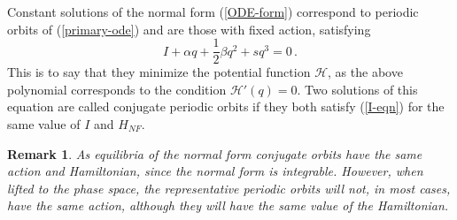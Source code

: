 \documentclass[10pt]{article}
\newtheorem{rmk}[thm]{Remark}
\begin{document}
Constant solutions of the normal form (\ref{ODE-form}) correspond to periodic
orbits of (\ref{primary-ode}) and are those with fixed action, satisfying
%
\begin{equation}\label{I-eqn}
I + \alpha q + \frac{1}{2}\beta q^2 + s q^3 =0\,.
\end{equation}
%
This is to say that they minimize the potential function $\mathcal{H}$, as the
above polynomial corresponds to the condition $\mathcal{H}'(q) = 0$. Two solutions of this
equation are called conjugate periodic orbits if they both satisfy (\ref{I-eqn})
for the same value of $I$ and $H_{NF}$. 

\begin{rmk} As equilibria of the normal form conjugate orbits have the same action and Hamiltonian, since the normal form is integrable.  However, when lifted to the phase space, the representative periodic orbits will not, in most cases, have the same action, although they will have the same value of the Hamiltonian.
\end{rmk}
\end{document}
